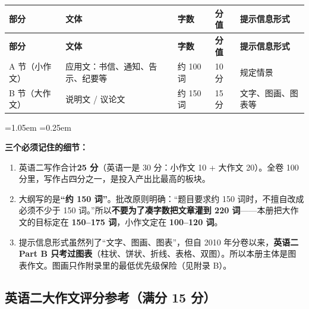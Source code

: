 \documentclass[11pt,a4paper]{ctexart}
\newenvironment{note}{%
  \par\addvspace{5pt}%
  \begin{list}{}{\leftmargin=1.05em \rightmargin=0.25em \listparindent=0pt
    \itemindent=0pt \topsep=0pt \parsep=2pt \itemsep=2pt \partopsep=0pt}%
  \item\relax\small\color{ink}%
}{%
  \end{list}\addvspace{5pt}%
}
\begin{document}
\begin{longtable}{L{2.6cm} L{3.2cm} L{2.6cm} L{2.6cm} L{3.4cm}}
\toprule
\textbf{部分} & \textbf{文体} & \textbf{字数} & \textbf{分值} & \textbf{提示信息形式}\\
\midrule
\endfirsthead
\toprule
\textbf{部分} & \textbf{文体} & \textbf{字数} & \textbf{分值} & \textbf{提示信息形式}\\
\midrule
\endhead
A 节（小作文） & 应用文：书信、通知、告示、纪要等 & 约 100 词 & 10 分 & 规定情景\\
B 节（大作文） & 说明文 / 议论文 & 约 150 词 & 15 分 & 文字、图画、图表等\\
\bottomrule
\end{longtable}

\begin{note}
\textbf{三个必须记住的细节：}
\begin{enumerate}[leftmargin=1.6em,itemsep=1pt,topsep=2pt]
\item 英语二写作合计\textbf{25 分}（英语一是 30 分：小作文 10 + 大作文 20）。全卷 100 分里，写作占四分之一，是投入产出比最高的板块。
\item 大纲写的是\textbf{“约 150 词”}。批改原则明确：“题目要求约 150 词时，不擅自改成必须不少于 150 词。”所以\textbf{不要为了凑字数把文章灌到 220 词}——本册把大作文的目标定在 \textbf{150--175 词}，小作文定在 \textbf{100--120 词}。
\item 提示信息形式虽然列了“文字、图画、图表”，但自 2010 年分卷以来，\textbf{英语二 Part B 只考过图表}（柱状、饼状、折线、表格、双图）。所以本册主体是图表作文。图画只作附录里的最低优先级保险（见附录 B）。
\end{enumerate}
\end{note}

\subsection{英语二大作文评分参考（满分 15 分）}
\end{document}
